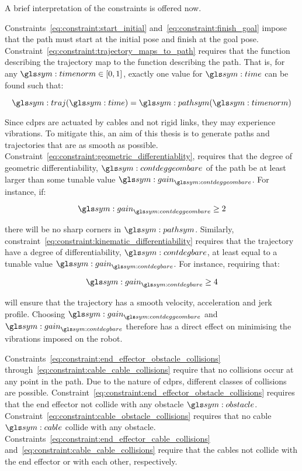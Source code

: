 	A brief interpretation of the constraints is offered now.

	Constraints~\ref{eq:constraint:start_initial}
	and~\ref{eq:constraint:finish_goal} impose that the path must start at the
	initial pose and finish at the goal pose.
	Constraint~\ref{eq:constraint:trajectory_maps_to_path} requires that the
	function describing the trajectory map to the function describing the path.
	That is, for any $\timenorm \in [0, 1]$, exactly one value for $\timesym$
	can be found such that:

	\begin{equation}
		\traj(\timesym) = \pathsym(\timenorm)
	\end{equation}

	Since \glspl{cdpr} are actuated by cables and not rigid links, they may
	experience vibrations. To mitigate this, an aim of this thesis is to
	generate paths and trajectories that are as smooth as possible.
	Constraint~\ref{eq:constraint:geometric_differentiablity}, requires that the
	degree of geometric differentiability, $\contdeggeombare$ of the path be at
	least larger than some tunable value $\gain_{\contdeggeombare}$. For
	instance, if:

	\begin{equation}
		\gain_{\contdeggeombare} \geq 2
	\end{equation}

	there will be no sharp corners in $\pathsym$. Similarly,
	constraint~\ref{eq:constraint:kinematic_differentiability} requires that the
	trajectory have a degree of differentiability, $\contdegbare$, at least
	equal to a tunable value $\gain_{\contdegbare}$. For instance, requiring
	that:

	\begin{equation}
		\gain_{\contdegbare} \geq 4
	\end{equation}

	will ensure that the trajectory has a smooth velocity, acceleration and jerk
	profile. Choosing $\gain_{\contdeggeombare}$ and $\gain_{\contdegbare}$
	therefore has a direct effect on minimising the vibrations imposed on the
	robot.

	Constraints~\ref{eq:constraint:end_effector_obstacle_collisions}
	through~\ref{eq:constraint:cable_cable_collisions} require that no
	collisions occur at any point in the path. Due to the nature of
	\glspl{cdpr}, different classes of collisions are possible.
	Constraint~\ref{eq:constraint:end_effector_obstacle_collisions} requires
	that the end effector not collide with any obstacle $\obstacle$.
	Constraint~\ref{eq:constraint:cable_obstacle_collisions} requires that no
	cable $\cable$ collide with any obstacle.
	Constraints~\ref{eq:constraint:end_effector_cable_collisions}
	and~\ref{eq:constraint:cable_cable_collisions} require that the cables not
	collide with the end effector or with each other, respectively.

